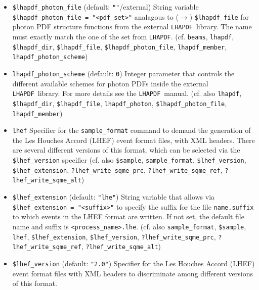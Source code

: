 \documentclass[12pt]{book}
\newcommand{\ttt}[1]{\texttt{#1}}
\newcommand{\lhapdf}{\texttt{LHAPDF}}
\begin{document}
\begin{itemize}
\ttt{\$lhapdf\_file}, \ttt{\$lhapdf\_photon\_file},
\ttt{lhapdf\_member}, \ttt{lhapdf\_photon\_scheme})
\item
\ttt{\$lhapdf\_photon\_file} \qquad (default: \ttt{""}/external) \newline
String variable \ttt{\$lhapdf\_photon\_file = "<pdf\_set>"} 
analagous to ($\to$) \ttt{\$lhapdf\_file} 
for photon PDF structure functions from the external \lhapdf\
library. The name must exactly match the one of the set from \lhapdf. 
(cf. \ttt{beams}, \ttt{lhapdf}, \ttt{\$lhapdf\_dir},
\ttt{\$lhapdf\_file}, \ttt{\$lhapdf\_photon\_file},
\ttt{lhapdf\_member}, \ttt{lhapdf\_photon\_scheme})
\item
\ttt{lhapdf\_photon\_scheme} \qquad (default: \ttt{0}) \newline
Integer parameter that controls the different available schemes for
photon PDFs inside the external \lhapdf\ library. For more details see
the \lhapdf\ manual.  (cf. also
\ttt{lhapdf}, \ttt{\$lhapdf\_dir}, \ttt{\$lhapdf\_file},
\ttt{lhapdf\_photon}, \ttt{\$lhapdf\_photon\_file},
\ttt{lhapdf\_member}) 
\item
\ttt{lhef} \newline 
Specifier for the \ttt{sample\_format} command to demand the
generation of the Les Houches Accord (LHEF) event format files, with
XML headers. There are several different versions of this format,
which can be selected via the \ttt{\$lhef\_version} specifier
(cf. also \ttt{\$sample}, \ttt{sample\_format}, \ttt{\$lhef\_version},
\ttt{\$lhef\_extension}, \ttt{?lhef\_write\_sqme\_prc},
\newline \ttt{?lhef\_write\_sqme\_ref}, \ttt{?lhef\_write\_sqme\_alt}) 
\item
\ttt{\$lhef\_extension} \qquad (default: \ttt{"lhe"}) \newline
String variable that allows via \ttt{\$lhef\_extension = "<suffix>"} to 
specify the suffix for the file \ttt{name.suffix} to which events in
the LHEF format are written. If not set, the default file name and suffix is
\ttt{<process\_name>.lhe}. (cf. also \ttt{sample\_format},
\ttt{\$sample}, \ttt{lhef}, \ttt{\$lhef\_extension},
\ttt{\$lhef\_version}, \ttt{?lhef\_write\_sqme\_prc},
\ttt{?lhef\_write\_sqme\_ref}, \ttt{?lhef\_write\_sqme\_alt})  
\item
\ttt{\$lhef\_version} \qquad (default: \ttt{"2.0"}) \newline 
Specifier for the Les Houches Accord (LHEF) event format files with
XML headers to discriminate among different versions of this format.

\end{itemize}
\end{document}

